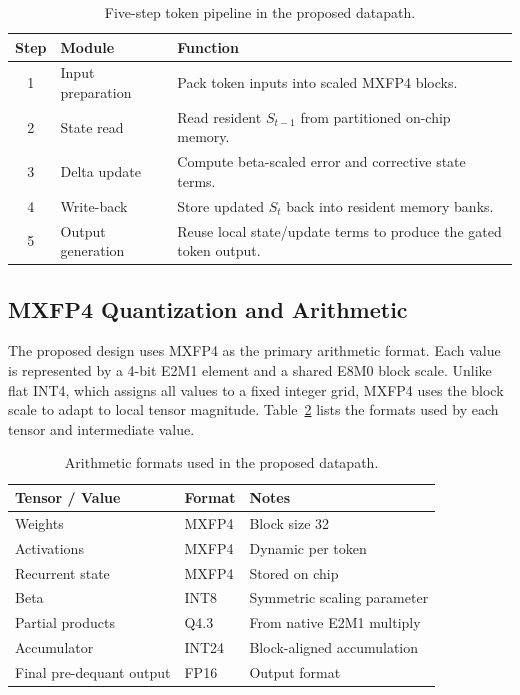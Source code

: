 \documentclass[conference]{IEEEtran}
\begin{document}
\begin{table}[t]
\centering
\caption{Five-step token pipeline in the proposed datapath.}
\label{tab:five_step_token_pipeline}
\scriptsize
\begin{tabularx}{\linewidth}{clX}
\toprule
Step & Module & Function \\
\midrule
1 & Input preparation & Pack token inputs into scaled MXFP4 blocks. \\
2 & State read & Read resident $S_{t-1}$ from partitioned on-chip memory. \\
3 & Delta update & Compute beta-scaled error and corrective state terms. \\
4 & Write-back & Store updated $S_t$ back into resident memory banks. \\
5 & Output generation & Reuse local state/update terms to produce the gated token output. \\
\bottomrule
\end{tabularx}
\end{table}

\subsection{MXFP4 Quantization and Arithmetic}
The proposed design uses MXFP4 as the primary arithmetic format. Each value is represented by a 4-bit E2M1 element and a shared E8M0 block scale. Unlike flat INT4, which assigns all values to a fixed integer grid, MXFP4 uses the block scale to adapt to local tensor magnitude. Table~\ref{tab:data_formats} lists the formats used by each tensor and intermediate value.

\begin{table}[t]
\centering
\caption{Arithmetic formats used in the proposed datapath.}
\label{tab:data_formats}
\footnotesize
\begin{tabularx}{\linewidth}{llX}
\toprule
Tensor / Value & Format & Notes \\
\midrule
Weights & MXFP4 & Block size 32 \\
Activations & MXFP4 & Dynamic per token \\
Recurrent state & MXFP4 & Stored on chip \\
Beta & INT8 & Symmetric scaling parameter \\
Partial products & Q4.3 & From native E2M1 multiply \\
Accumulator & INT24 & Block-aligned accumulation \\
Final pre-dequant output & FP16 & Output format \\
\bottomrule
\end{tabularx}
\end{table}
\end{document}
